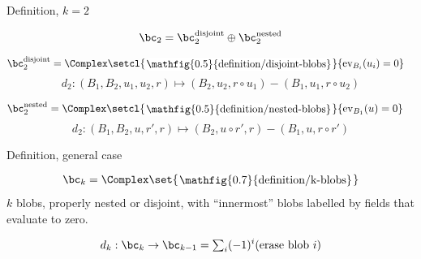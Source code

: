 \documentclass[beamer, compress]{beamer}
\begin{document}
\begin{frame}{Definition, $k=2$}
\begin{block}{}
\vspace{-1mm}
$$\bc_2 = \bc_2^{\text{disjoint}} \oplus \bc_2^{\text{nested}}$$
\end{block}
\begin{block}{}
\vspace{-5mm}
\begin{align*}
\bc_2^{\text{disjoint}} & =  \Complex\setcl{\roundframe{\mathfig{0.5}{definition/disjoint-blobs}}}{\text{ev}_{B_i}(u_i) = 0}
\end{align*}
\vspace{-4mm}
$$d_2 : (B_1, B_2, u_1, u_2, r) \mapsto (B_2, u_2, r \circ u_1) - (B_1, u_1, r \circ u_2)$$
\end{block}
\begin{block}{}
\vspace{-5mm}
\begin{align*}
\bc_2^{\text{nested}} & = \Complex\setcl{\roundframe{\mathfig{0.5}{definition/nested-blobs}}}{\text{ev}_{B_1}(u)=0}
\end{align*}
\vspace{-4mm}
$$d_2 : (B_1, B_2, u, r', r) \mapsto (B_2, u \circ r', r) - (B_1, u, r \circ r')$$
\end{block}
\end{frame}

\begin{frame}{Definition, general case}
\begin{block}{}
$$\bc_k = \Complex\set{\roundframe{\mathfig{0.7}{definition/k-blobs}}}$$
$k$ blobs, properly nested or disjoint, with ``innermost'' blobs labelled by fields that evaluate to zero.
\end{block}
\begin{block}{}
\vspace{-2mm}
$$d_k : \bc_k \to \bc_{k-1} = {\textstyle \sum_i} (-1)^i (\text{erase blob $i$})$$
\end{block}
\end{frame}
\end{document}
